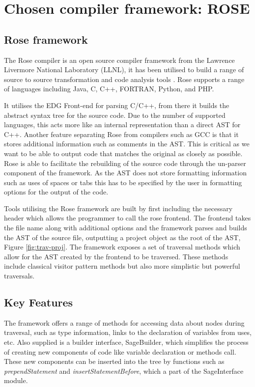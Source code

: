 \documentclass[bsc,frontabs,singlespacing,twoside,parskip,deptreport]{infthesis}
\begin{document}
\section{Chosen compiler framework: ROSE}
\subsection{Rose framework}
The Rose compiler \cite{ROSE} is an open source compiler framework from the Lawrence Livermore National Laboratory (LLNL), it has been utilised to build a range of source to source transformation and code analysis tools \cite{ROSE_TOOLS}. Rose supports a range of languages including Java, C, C++, FORTRAN, Python, and PHP. 

It utilises the EDG Front-end \cite{EDG} for parsing C/C++, from there it builds the abstract syntax tree for the source code. Due to the number of supported languages, this acts more like an internal representation than a direct AST for C++. Another feature separating Rose from compilers such as GCC is that it stores additional information such as comments in the AST. This is critical as we want to be able to output code that matches the original as closely as possible. Rose is able to facilitate the rebuilding of the source code through the un-parser component of the framework. As the AST does not store formatting information such as uses of spaces or tabs this has to be specified by the user in formatting options for the output of the code.

Tools utilising the Rose framework are built by first including the necessary header which allows the programmer to call the rose frontend. The frontend takes the file name along with additional options and the framework parses and builds the AST of the source file, outputting a project object as the root of the AST, Figure \ref{fig:trav-proj}. The framework exposes a set of traversal methods which allow for the AST created by the frontend to be traversed. These methods include classical visitor pattern methods but also more simplistic but powerful traversals. 

\subsection{Key Features}

The framework offers a range of methods for accessing data about nodes during traversal, such as type information, links to the declaration of variables from uses, etc. Also supplied is a builder interface, SageBuilder, which simplifies the process of creating new components of code like variable declaration or methods call. These new components can be inserted into the tree by functions such as \textit{prependStatement} and \textit{insertStatementBefore}, which a part of the SageInterface module. 
\end{document}
